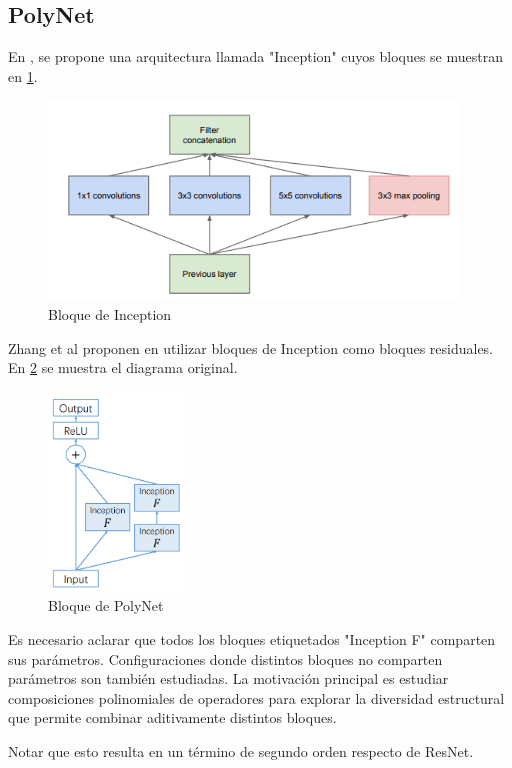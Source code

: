 \documentclass[titlepage,a4paper,oneside]{article}
\begin{document}
\subsection{PolyNet}
En \cite{szegedy2014going}, se propone una arquitectura llamada "Inception" cuyos bloques se muestran en \ref{inception_block}.

\begin{figure}[H]
\centering
\includegraphics[height=200px]{images/inception_block.png}
\caption{Bloque de Inception}
\label{inception_block}
\end{figure}

Zhang et al proponen en \cite{zhang2017polynet} utilizar bloques de Inception como bloques residuales. En \ref{polynet_block} se muestra el diagrama original.

\begin{figure}[H]
\centering
\includegraphics[height=200px]{images/polynet.png}
\caption{Bloque de PolyNet}
\label{polynet_block}
\end{figure}

Es necesario aclarar que todos los bloques etiquetados "Inception F" comparten sus parámetros. Configuraciones donde distintos bloques no comparten parámetros son también estudiadas. La motivación principal es estudiar composiciones polinomiales de operadores para explorar la diversidad estructural que permite combinar aditivamente distintos bloques.

Notar que esto resulta en un término de segundo orden respecto de ResNet.
\end{document}
